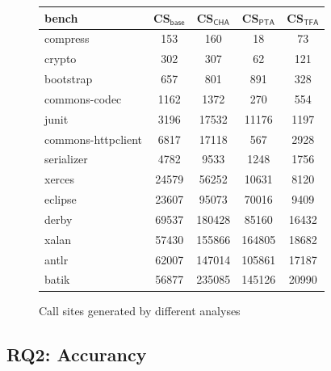 \documentclass{llncs}
\begin{document}
\begin{figure}[t!]
  \centering
\begin{tabular}{lcccc}
	\hline
	\textbf{bench} & \textbf{CS$_{\textsf{base}}$} &\hspace{5pt} \textbf{CS$_{\textsf{CHA}}$}\hspace{5pt} &\hspace{5pt} \textbf{CS$_{\textsf{PTA}}$}\hspace{5pt} & \hspace{5pt} \textbf{CS$_{\textsf{TFA}}$}\hspace{5pt} \\
	\hline
	compress & 153 & 160 & 18 & 73 \\
	crypto & 302 & 307 & 62 & 121 \\
	bootstrap & 657 & 801 & 891 & 328 \\
	commons-codec & 1162 & 1372 & 270 & 554 \\
	junit & 3196 & 17532 & 11176 & 1197 \\
	commons-httpclient & 6817 & 17118 & 567 & 2928 \\
	serializer & 4782 & 9533 & 1248 & 1756 \\
	xerces & 24579 & 56252 & 10631 & 8120 \\
	eclipse & 23607 & 95073 & 70016 & 9409 \\
	derby & 69537 & 180428 & 85160 & 16432 \\
	xalan & 57430 & 155866 & 164805 & 18682 \\
	antlr & 62007 & 147014 & 105861 & 17187 \\
	batik & 56877 & 235085 & 145126 & 20990 \\
	\hline
\end{tabular}
\caption{Call sites generated by different analyses}
\label{experiment:Callsite}
\end{figure}

\subsection{RQ2: Accurancy}\label{subsec:accurancy}
\end{document}

